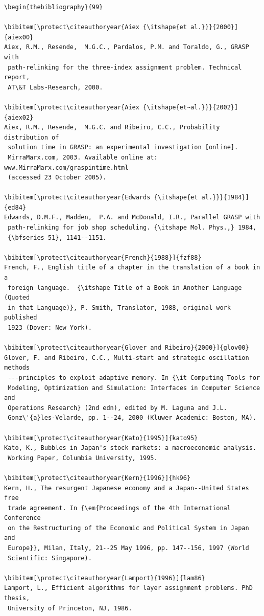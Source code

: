 \documentclass{rQUF2e}
\theoremstyle{plain}
\theoremstyle{definition}
\theoremstyle{remark}
\begin{document}
\begin{verbatim}
\begin{thebibliography}{99}

\bibitem[\protect\citeauthoryear{Aiex {\itshape{et al.}}}{2000}]{aiex00}
Aiex, R.M., Resende,  M.G.C., Pardalos, P.M. and Toraldo, G., GRASP with
 path-relinking for the three-index assignment problem. Technical report,
 AT\&T Labs-Research, 2000.

\bibitem[\protect\citeauthoryear{Aiex {\itshape{et~al.}}}{2002}]{aiex02}
Aiex, R.M., Resende,  M.G.C. and Ribeiro, C.C., Probability distribution of
 solution time in GRASP: an experimental investigation [online].
 MirraMarx.com, 2003. Available online at: www.MirraMarx.com/graspintime.html
 (accessed 23 October 2005).

\bibitem[\protect\citeauthoryear{Edwards {\itshape{et al.}}}{1984}]{ed84}
Edwards, D.M.F., Madden,  P.A. and McDonald, I.R., Parallel GRASP with
 path-relinking for job shop scheduling. {\itshape Mol. Phys.,} 1984,
 {\bfseries 51}, 1141--1151.

\bibitem[\protect\citeauthoryear{French}{1988}]{fzf88}
French, F., English title of a chapter in the translation of a book in a
 foreign language.  {\itshape Title of a Book in Another Language (Quoted
 in that Language)}, P. Smith, Translator, 1988, original work published
 1923 (Dover: New York).

\bibitem[\protect\citeauthoryear{Glover and Ribeiro}{2000}]{glov00}
Glover, F. and Ribeiro, C.C., Multi-start and strategic oscillation methods
 ---principles to exploit adaptive memory. In {\it Computing Tools for
 Modeling, Optimization and Simulation: Interfaces in Computer Science and
 Operations Research} (2nd edn), edited by M. Laguna and J.L.
 Gonz\'{a}les-Velarde, pp. 1--24, 2000 (Kluwer Academic: Boston, MA).

\bibitem[\protect\citeauthoryear{Kato}{1995}]{kato95}
Kato, K., Bubbles in Japan's stock markets: a macroeconomic analysis.
 Working Paper, Columbia University, 1995.

\bibitem[\protect\citeauthoryear{Kern}{1996}]{hk96}
Kern, H., The resurgent Japanese economy and a Japan--United States free
 trade agreement. In {\em{Proceedings of the 4th International Conference
 on the Restructuring of the Economic and Political System in Japan and
 Europe}}, Milan, Italy, 21--25 May 1996, pp. 147--156, 1997 (World
 Scientific: Singapore).

\bibitem[\protect\citeauthoryear{Lamport}{1996}]{lam86}
Lamport, L., Efficient algorithms for layer assignment problems. PhD thesis,
 University of Princeton, NJ, 1986.


\end{verbatim}
\end{document}
